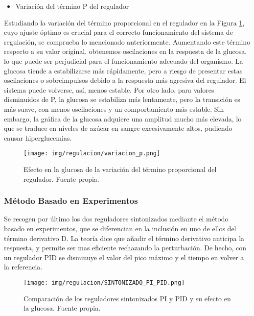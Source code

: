 \begin{itemize}
    \item Variación del término P del regulador
\end{itemize}

Estudiando la variación del término proporcional en el regulador en la Figura \ref{fig:variacion_p}, cuyo ajuste óptimo es crucial para el correcto funcionamiento del sistema de regulación, se comprueba lo mencionado anteriormente. Aumentando este término respecto a su valor original, obtenemos oscilaciones en la respuesta de la glucosa, lo que puede ser perjudicial para el funcionamiento adecuado del organismo. La glucosa tiende a estabilizarse más rápidamente, pero a riesgo de presentar estas oscilaciones o sobreimpulsos debido a la respuesta más agresiva del regulador. El sistema puede volverse, así, menos estable. Por otro lado, para valores disminuidos de P, la glucosa se estabiliza más lentamente, pero la transición es más suave, con menos oscilaciones y un comportamiento más estable. Sin embargo, la gráfica de la glucosa adquiere una amplitud mucho más elevada, lo que se traduce en niveles de azúcar en sangre excesivamente altos, pudiendo causar hiperglucemias.

\begin{figure}[htbp]
    \centering
    \texttt{[image: img/regulacion/variacion\_p.png]}
    \caption{Efecto en la glucosa de la variación del término proporcional del regulador. Fuente propia.}
    \label{fig:variacion_p}
\end{figure}



\subsubsection{Método Basado en Experimentos}

Se recogen por último los dos reguladores sintonizados mediante el método basado en experimentos, que se diferencian en la inclusión en uno de ellos del término derivativo D. La teoría dice que añadir el término derivativo anticipa la respuesta, y permite ser mas eficiente rechazando la perturbación. De hecho, con un regulador PID se disminuye el valor del pico máximo y el tiempo en volver a la referencia. 

\begin{figure}[htbp]
    \centering
    \texttt{[image: img/regulacion/SINTONIZADO\_PI\_PID.png]}
    \caption{Comparación de los reguladores sintonizados PI y PID y su efecto en la glucosa. Fuente propia.}
    \label{fig:sintonizado_PID}
\end{figure}

